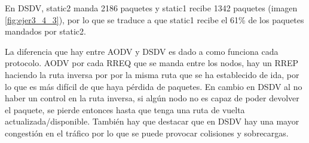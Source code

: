 En DSDV, static2 manda 2186 paquetes y static1 recibe 1342 paquetes (imagen \ref{fig:ejer3_4_3}), por lo que se traduce a que static1 recibe el 61\% de los paquetes mandados por static2. 

La diferencia que hay entre AODV y DSDV es dado a como funciona cada protocolo. AODV por cada RREQ que se manda entre los nodos, hay un RREP haciendo la ruta inversa por por la misma ruta que se ha establecido de ida, por lo que es más difícil de que haya pérdida de paquetes. En cambio en DSDV al no haber un control en la ruta inversa, si algún nodo no es capaz de poder devolver el paquete, se pierde entonces hasta que tenga una ruta de vuelta actualizada/disponible. También hay que destacar que en DSDV hay una mayor congestión en el tráfico por lo que se puede provocar colisiones y sobrecargas.